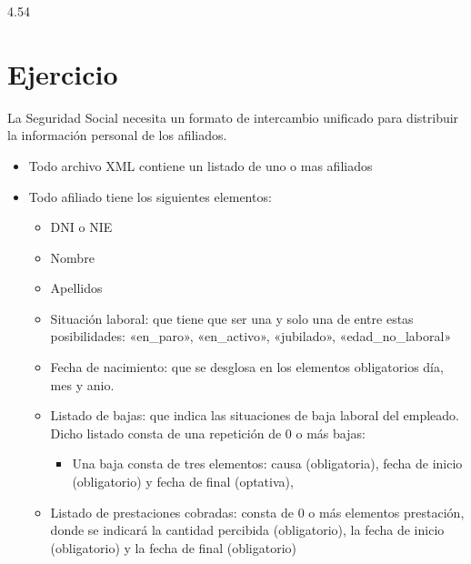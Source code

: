 \documentclass[letterpaper,10pt,spanish]{sphinxmanual}
\begin{document}
\begin{sphinxVerbatim}[commandchars=\\\{\}]
                4.54\PYGZpc{}
\end{sphinxVerbatim}


\section{Ejercicio}
\label{\detokenize{tema5:id3}}
La Seguridad Social necesita un formato de intercambio unificado para distribuir la información personal de los afiliados.
\begin{itemize}
\item {} 
Todo archivo XML contiene un listado de uno o mas afiliados

\item {} 
Todo afiliado tiene los siguientes elementos:
\begin{itemize}
\item {} 
DNI o NIE

\item {} 
Nombre

\item {} 
Apellidos

\item {} 
Situación laboral: que tiene que ser una y solo una de entre estas posibilidades: «en\_paro», «en\_activo», «jubilado», «edad\_no\_laboral»

\item {} 
Fecha de nacimiento: que se desglosa en los elementos obligatorios día, mes y anio.

\item {} 
Listado de bajas: que indica las situaciones de baja laboral del empleado. Dicho listado consta de una repetición de 0 o más bajas:
\begin{itemize}
\item {} 
Una baja consta de tres elementos: causa (obligatoria), fecha de inicio (obligatorio) y fecha de final (optativa),

\end{itemize}

\item {} 
Listado de prestaciones cobradas: consta de 0 o más elementos prestación, donde se indicará la cantidad percibida (obligatorio), la fecha de inicio (obligatorio) y la fecha de final (obligatorio)

\end{itemize}

\end{itemize}
\end{document}
